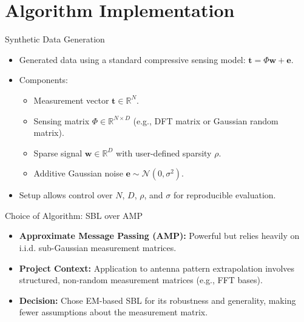 \documentclass{beamer}
\begin{document}
\section{Algorithm Implementation}
\begin{frame}{Synthetic Data Generation}
    \begin{itemize}
        \item Generated data using a standard compressive sensing model: $\mathbf{t} = \Phi \mathbf{w} + \mathbf{e}$. 
        \item Components:
            \begin{itemize}
                \item Measurement vector $\mathbf{t} \in \mathbb{R}^N$. 
                \item Sensing matrix $\Phi \in \mathbb{R}^{N \times D}$ (e.g., DFT matrix or Gaussian random matrix). 
                \item Sparse signal $\mathbf{w} \in \mathbb{R}^{D}$ with user-defined sparsity $\rho$. 
                \item Additive Gaussian noise $\mathbf{e} \sim \mathcal{N}(0, \sigma^2)$. 
            \end{itemize}
        \item Setup allows control over $N$, $D$, $\rho$, and $\sigma$ for reproducible evaluation. 
    \end{itemize}
\end{frame}

\begin{frame}{Choice of Algorithm: SBL over AMP}
    \begin{itemize}
        \item \textbf{Approximate Message Passing (AMP):} Powerful but relies heavily on i.i.d. sub-Gaussian measurement matrices. 
        \item \textbf{Project Context:} Application to antenna pattern extrapolation involves structured, non-random measurement matrices (e.g., FFT bases). 
        \item \textbf{Decision:} Chose EM-based SBL for its robustness and generality, making fewer assumptions about the measurement matrix. 
    \end{itemize}
\end{frame}
\end{document}
